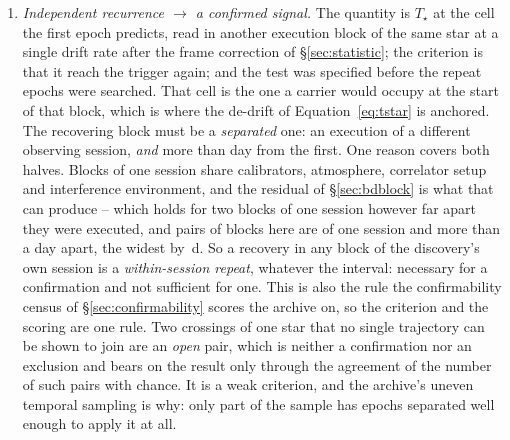 \begin{enumerate}[label=(\roman*),leftmargin=1.9em,itemsep=3pt,topsep=3pt,parsep=0pt]
property of a frequency, so this is an attribution and not an exclusion, and
\textbf{every crossing goes on to the recurrence test whichever side of the
window it falls}, wherever a later block covers the frequency. An
unattributed crossing is a target for follow-up and not a detection. The
window's price is that the survey constrains nothing inside it
(Appendix~\ref{app:linemask}).
\item \emph{Independent recurrence $\to$ a confirmed signal.} The quantity is
$T_\star$ at the cell the first epoch predicts, read in another execution
block of the same star at a single drift rate after the frame correction of
\S\ref{sec:statistic}; the criterion is that it reach the trigger again; and
the test was specified before the repeat epochs were searched. That cell is the one a carrier would occupy at the start of that block,
which is where the de-drift of Equation~\ref{eq:tstar} is anchored. The
recovering block must be a \emph{separated} one: an execution of a different
observing session, \emph{and} more than \EpSep{} day from the first. One
reason covers both halves. Blocks of one session share calibrators,
atmosphere, correlator setup and interference environment, and the residual
of \S\ref{sec:bdblock} is what that can produce -- which holds for two blocks
of one session however far apart they were executed, and \QfNPairDrop{} pairs
of blocks here are of one session and more than a day apart, the widest by
\QfSameSessMaxD\,d. So a recovery in any block of the discovery's own session
is a \emph{within-session repeat}, whatever the interval: necessary for a
confirmation and not sufficient for one. This is also the rule the
confirmability census of \S\ref{sec:confirmability} scores the archive on, so
the criterion and the scoring are one rule. Two crossings
of one star that no single trajectory can be shown to join are an \emph{open}
pair, which is neither a confirmation nor
an exclusion and bears on the result only through the agreement of the number
of such pairs with chance. It is a weak criterion, and the archive's uneven
temporal sampling is why: only part of the sample has epochs separated well
enough to apply it at all.
\end{enumerate}

